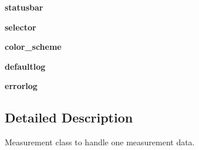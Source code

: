 \begin{DoxyCompactItemize}
\item 
\hypertarget{classModules_1_1Measurement_1_1Measurement_ad36c14bc93a1c1fdf77d31683a3d3dd3}{{\bfseries statusbar}}\label{classModules_1_1Measurement_1_1Measurement_ad36c14bc93a1c1fdf77d31683a3d3dd3}

\item 
\hypertarget{classModules_1_1Measurement_1_1Measurement_ada2b6959b71e6c27c96509091145ba24}{{\bfseries selector}}\label{classModules_1_1Measurement_1_1Measurement_ada2b6959b71e6c27c96509091145ba24}

\item 
\hypertarget{classModules_1_1Measurement_1_1Measurement_a483d72870ef09fdad479e9b49fbdc72d}{{\bfseries color\-\_\-scheme}}\label{classModules_1_1Measurement_1_1Measurement_a483d72870ef09fdad479e9b49fbdc72d}

\item 
\hypertarget{classModules_1_1Measurement_1_1Measurement_a25ec382a6e41f6790001547fcaa334b1}{{\bfseries defaultlog}}\label{classModules_1_1Measurement_1_1Measurement_a25ec382a6e41f6790001547fcaa334b1}

\item 
\hypertarget{classModules_1_1Measurement_1_1Measurement_a3ca06d48cad5fc913ff1aef6510c6671}{{\bfseries errorlog}}\label{classModules_1_1Measurement_1_1Measurement_a3ca06d48cad5fc913ff1aef6510c6671}

\end{DoxyCompactItemize}


\subsection{Detailed Description}
\begin{DoxyVerb}Measurement class to handle one measurement data.
\end{DoxyVerb}
 

